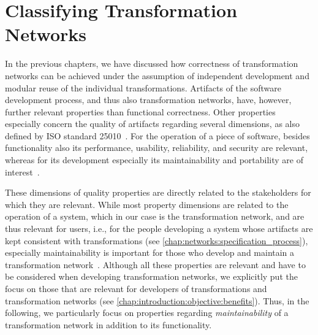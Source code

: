 \chapter{Classifying Transformation Networks
}
\label{chap:classification}

In the previous chapters, we have discussed how correctness of transformation networks can be achieved under the assumption of independent development and modular reuse of the individual transformations.
Artifacts of the software development process, and thus also transformation networks, have, however, further relevant properties than functional correctness.
Other properties especially concern the quality of artifacts regarding several dimensions, as also defined by ISO standard 25010~\cite{iso25010}.
For the operation of a piece of software, besides functionality also its performance, usability, reliability, and security are relevant, whereas for its development especially its maintainability and portability are of interest~\cite[Tab.~2]{iso25010}.

These dimensions of quality properties are directly related to the stakeholders for which they are relevant.
While most property dimensions are related to the operation of a system, which in our case is the transformation network, and are thus relevant for users, i.e., for the people developing a system whose artifacts are kept consistent with transformations (see \autoref{chap:networks:specification_process}), especially maintainability is important for those who develop and maintain a transformation network~\cite[Tab.~2]{iso25010}.
Although all these properties are relevant and have to be considered when developing transformation networks, we explicitly put the focus on those that are relevant for developers of transformations and transformation networks (see \autoref{chap:introduction:objective:benefits}).
Thus, in the following, we particularly focus on properties regarding \emph{maintainability} of a transformation network in addition to its functionality.

